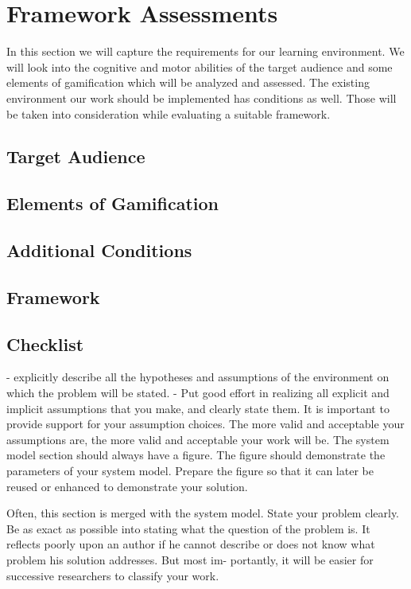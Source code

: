 
\chapter{Framework Assessments}
\label{chap:assessment}

In this section we will capture the requirements for our learning environment.
We will look into the cognitive and motor abilities of the target audience and
some elements of gamification which will be analyzed and assessed.
The existing environment our work should be implemented has conditions as well.
Those will be taken into consideration while evaluating a suitable framework.

\section*{Target Audience}
\section*{Elements of Gamification}
\section*{Additional Conditions}
\section*{Framework}


\section{Checklist}
- explicitly describe all the hypotheses and assumptions of the environment on which the problem will be stated.
- Put good effort in realizing all explicit and implicit assumptions that you make, and clearly state them.
It is important to provide support for
your assumption choices. The more valid and acceptable
your assumptions are, the more valid and acceptable your
work will be.
The system model section should always have a figure.
The figure should demonstrate the parameters of your
system model. Prepare the figure so that it can later be
reused or enhanced to demonstrate your solution.

Often, this section is merged with the system model.
State your problem clearly. Be as exact as possible into
stating what the question of the problem is. It reflects
poorly upon an author if he cannot describe or does not
know what problem his solution addresses. But most im-
portantly, it will be easier for successive researchers to
classify your work.
